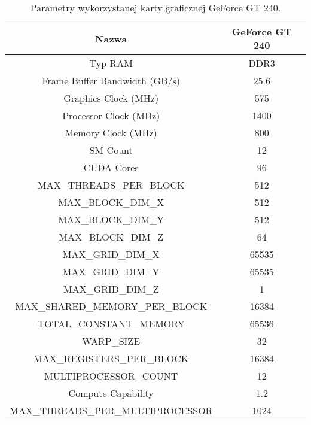\begin{table}[H]
\centering
\begin{tabular}{|c|c|}
\hline
Nazwa & GeForce GT 240 \\ \hline
Typ RAM & DDR3 \\ \hline
Frame Buffer Bandwidth (GB/s) & 25.6 \\ \hline
Graphics Clock (MHz) & 575 \\ \hline
Processor Clock (MHz) & 1400 \\ \hline
Memory Clock (MHz) & 800 \\ \hline
SM Count & 12 \\ \hline
CUDA Cores & 96 \\ \hline
MAX\_THREADS\_PER\_BLOCK & 512 \\ \hline
MAX\_BLOCK\_DIM\_X & 512 \\ \hline
MAX\_BLOCK\_DIM\_Y & 512 \\ \hline
MAX\_BLOCK\_DIM\_Z & 64 \\ \hline
MAX\_GRID\_DIM\_X & 65535 \\ \hline
MAX\_GRID\_DIM\_Y & 65535 \\ \hline
MAX\_GRID\_DIM\_Z & 1 \\ \hline
MAX\_SHARED\_MEMORY\_PER\_BLOCK & 16384 \\ \hline
TOTAL\_CONSTANT\_MEMORY & 65536 \\ \hline
WARP\_SIZE & 32 \\ \hline
MAX\_REGISTERS\_PER\_BLOCK & 16384 \\ \hline
MULTIPROCESSOR\_COUNT & 12 \\ \hline
Compute Capability & 1.2 \\ \hline
MAX\_THREADS\_PER\_MULTIPROCESSOR & 1024 \\ \hline
\end{tabular}
\caption{Parametry wykorzystanej karty graficznej GeForce GT 240.}
\end{table}

\newpage
